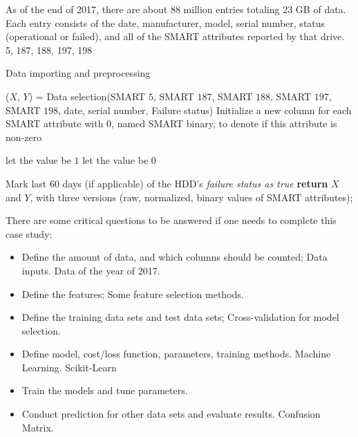\documentclass[12pt,a4paper,english]{amsart}
\begin{document}
As of the end of 2017, there are about 88 million entries totaling 23 GB of data. Each entry consists of the date, manufacturer, model, serial number, status (operational or failed), and all of the SMART attributes reported by that drive. 
5, 187, 188, 197, 198
\begin{algorithm}  
	\caption{Data importing and preprocessing}
	\LinesNumbered  
	($X$, $Y$) = Data selection(SMART $5$, SMART $187$, SMART $188$, SMART $197$, SMART $198$, date, serial number, Failure status)\;  
	Initialize a new column for each SMART attribute with $0$, named SMART binary, to denote if this attribute is non-zero  \;
	
	{
		{
			let the value be $1$
		}
	}
	{
		let the value be $0$ \;
	}

	{  
		Mark last $60$ days (if applicable) of the HDD's \textit{failure status as true} \;  
	}
	\textbf{return} $X$ and $Y$, with three versions (raw, normalized, binary values of SMART attributes);
\end{algorithm}  


There are some critical questions to be answered if one needs to complete this case study:

\begin{itemize}
	\item Define the amount of data, and which columns should be counted; Data inputs.
			Data of the year of 2017.
	\item Define the features; Some feature selection methods.
	\item Define the training data sets and test data sets; Cross-validation for model selection.
	\item Define model, cost/loss function, parameters, training methods. Machine Learning. Scikit-Learn
	\item Train the models and tune parameters.
	\item Conduct prediction for other data sets and evaluate results. Confusion Matrix.
\end{itemize}
\end{document}
